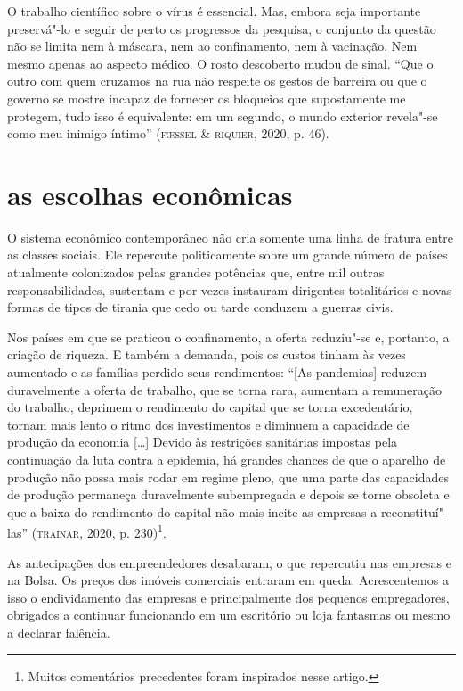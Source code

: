 O trabalho científico sobre o vírus é essencial. Mas, embora seja
importante preservá"-lo e seguir de perto os progressos da pesquisa, o
conjunto da questão não se limita nem à máscara, nem ao confinamento,
nem à vacinação. Nem mesmo apenas ao aspecto médico. O rosto descoberto
mudou de sinal. ``Que o outro com quem cruzamos na rua não respeite os
gestos de barreira ou que o governo se mostre incapaz de fornecer os
bloqueios que supostamente me protegem, tudo isso é equivalente: em um
segundo, o mundo exterior revela"-se como meu inimigo íntimo'' (\textsc{fœssel} \&
\textsc{riquier}, 2020, p. 46).

\section{as escolhas econômicas}

O sistema econômico contemporâneo não cria somente uma linha de fratura
entre as classes sociais. Ele repercute politicamente sobre um grande
número de países atualmente colonizados pelas grandes potências que,
entre mil outras responsabilidades, sustentam e por vezes instauram
dirigentes totalitários e novas formas de tipos de tirania que cedo ou
tarde conduzem a guerras civis.

Nos países em que se praticou o confinamento, a oferta reduziu"-se e,
portanto, a criação de riqueza. E também a demanda, pois os custos
tinham às vezes aumentado e as famílias perdido seus rendimentos:
``{[}As pandemias{]} reduzem duravelmente a oferta de trabalho, que se
torna rara, aumentam a remuneração do trabalho, deprimem o rendimento do
capital que se torna excedentário, tornam mais lento o ritmo dos
investimentos e diminuem a capacidade de produção da economia {[}\ldots{}{]}
Devido às restrições sanitárias impostas pela continuação da luta contra
a epidemia, há grandes chances de que o aparelho de produção não possa
mais rodar em regime pleno, que uma parte das capacidades de produção
permaneça duravelmente subempregada e depois se torne obsoleta e que a
baixa do rendimento do capital não mais incite as empresas a
reconstituí"-las'' (\textsc{trainar}, 2020, p. 230)\footnote{Muitos comentários
  precedentes foram inspirados nesse artigo.}.

As antecipações dos empreendedores desabaram, o que repercutiu nas
empresas e na Bolsa. Os preços dos imóveis comerciais entraram em queda.
Acrescentemos a isso o endividamento das empresas e principalmente dos
pequenos empregadores, obrigados a continuar funcionando em um
escritório ou loja fantasmas ou mesmo a declarar falência.

